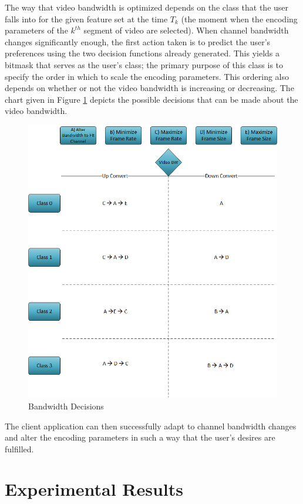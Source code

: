 The way that video bandwidth is optimized depends on the class that the user falls into for the given feature set at the time $T_k$ (the moment when the encoding parameters of the $k^{th}$ segment of video are selected). When channel bandwidth changes significantly enough, the first action taken is to predict the user’s preferences using the two decision functions already generated. This yields a bitmask that serves as the user’s class; the primary purpose of this class is to specify the order in which to scale the encoding parameters. This ordering also depends on whether or not the video bandwidth is increasing or decreasing. The chart given in Figure \ref{fig:ScalingDecisionChart} depicts the possible decisions that can be made about the video bandwidth.
\begin{figure}[H]
\centering
\includegraphics[width=0.65\linewidth]{images/BandwidthDecisions.png}
\caption{Bandwidth Decisions}
\label{fig:ScalingDecisionChart}
\end{figure}
The client application can then successfully adapt to channel bandwidth changes and alter the encoding parameters in such a way that the user’s desires are fulfilled.

\section{Experimental Results}
\label{sec:Results}

